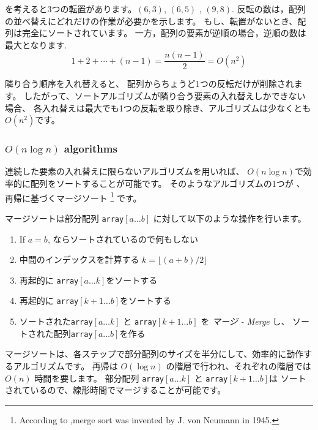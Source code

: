 \begin{center}
\end{center}
を考えると3つの転置があります。$(6,3)$, $(6,5)$ , $(9,8)$.
反転の数は，配列の並べ替えにどれだけの作業が必要かを示します。
もし、転置がないとき、配列は完全にソートされています。
一方，配列の要素が逆順の場合，逆順の数は最大となります.
\[1+2+\cdots+(n-1)=\frac{n(n-1)}{2} = O(n^2)\]


隣り合う順序を入れ替えると、
配列からちょうど1つの反転だけが削除されます。
したがって、ソートアルゴリズムが隣り合う要素の入れ替えしかできない場合、
各入れ替えは最大でも1つの反転を取り除き、アルゴリズムは少なくとも$O(n^2)$です。

\subsubsection{$O(n \log n)$ algorithms}


連続した要素の入れ替えに限らないアルゴリズムを用いれば、
$O(n \log n)$で効率的に配列をソートすることが可能です。
そのようなアルゴリズムの1つが 、再帰に基づくマージソート
\footnote{According to \cite{knu983},merge sort was invented by J. von Neumann in 1945.}
です。

マージソートは部分配列 \texttt{array}$[a \ldots b]$ に対して以下のような操作を行います。

\begin{enumerate}
\item If $a=b$, ならソートされているので何もしない
\item 中間のインデックスを計算する $k=\lfloor (a+b)/2 \rfloor$
\item 再起的に \texttt{array}$[a \ldots k]$をソートする
\item 再起的に \texttt{array}$[k+1 \ldots b]$をソートする
\item ソートされた\texttt{array}$[a \ldots k]$ と
\texttt{array}$[k+1 \ldots b]$ を \emph{マージ - Merge} し、
ソートされた配列\texttt{array}$[a \ldots b]$を作る
\end{enumerate}

マージソートは、各ステップで部分配列のサイズを半分にして、効率的に動作するアルゴリズムです。
再帰は $O(\log n)$ の階層で行われ、それぞれの階層では$O(n)$ 時間を要します。
部分配列 \texttt{array}$[a \ldots k]$ と \texttt{array}$[k+1 \ldots b]$は
ソートされているので、線形時間でマージすることが可能です。

